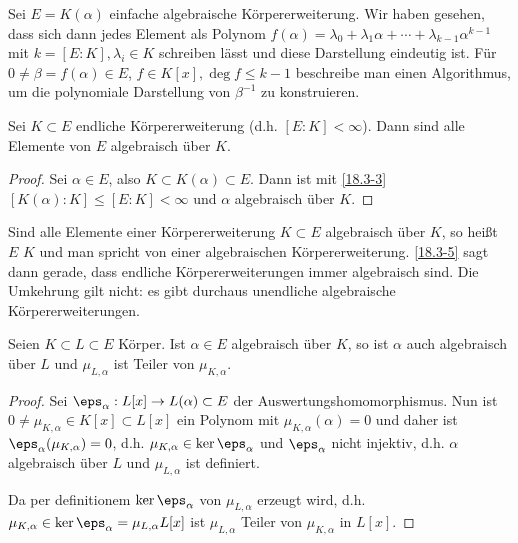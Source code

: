 \begin{ex} \label{18.3-4}
	Sei $E = K(\alpha)$ einfache algebraische Körpererweiterung.
	Wir haben gesehen, dass sich dann jedes Element als Polynom $f(\alpha) = \lambda_0 + \lambda_1 \alpha + \dotsb + \lambda_{k-1} \alpha^{k-1}$ mit $k = [E : K], \lambda_i \in K$ schreiben lässt und diese Darstellung eindeutig ist.
	Für $0 \neq \beta = f(\alpha) \in E$, $f \in K[x], \deg f \le k-1$ beschreibe man einen Algorithmus, um die polynomiale Darstellung von $\beta^{-1}$ zu konstruieren.
\end{ex}

\begin{kor} \label{18.3-5}
	Sei $K \subset E$ endliche Körpererweiterung (d.h. $[E : K] < \infty$).
	Dann sind alle Elemente von $E$ algebraisch über $K$.
	\begin{proof}
		Sei $\alpha \in E$, also $K \subset K(\alpha) \subset E$.
		Dann ist mit \ref{18.3-3} $[K(\alpha) : K] \le [E : K] < \infty$ und $\alpha$ algebraisch über $K$.
	\end{proof}
\end{kor}

Sind alle Elemente einer Körpererweiterung $K \subset E$ algebraisch über $K$, so heißt $E$  $K$ und man spricht von einer algebraischen Körpererweiterung.
\ref{18.3-5} sagt dann gerade, dass endliche Körpererweiterungen immer algebraisch sind.
Die Umkehrung gilt nicht: es gibt durchaus unendliche algebraische Körpererweiterungen.

\begin{lem} \label{18.3-6}
	Seien $K \subset L \subset E$ Körper.
	Ist $\alpha \in E$ algebraisch über $K$, so ist $\alpha$ auch algebraisch über $L$ und $\mu_{L, \alpha}$ ist Teiler von $\mu_{K, \alpha}$.
	\begin{proof}
		Sei $\eps_\alpha: L[x] \to L(\alpha) \subset E$ der Auswertungshomomorphismus.
		Nun ist $0 \neq \mu_{K, \alpha} \in K[x] \subset L[x]$ ein Polynom mit $\mu_{K, \alpha}(\alpha) = 0$ und daher ist $\eps_\alpha(\mu_{K, \alpha}) = 0$, d.h. $\mu_{K, \alpha} \in \ker \eps_\alpha$ und $\eps_\alpha$ nicht injektiv, d.h. $\alpha$ algebraisch über $L$ und $\mu_{L,\alpha}$ ist definiert.

		Da per definitionem $\ker \eps_\alpha$ von $\mu_{L, \alpha}$ erzeugt wird, d.h. $\mu_{K,\alpha} \in \ker \eps_\alpha = \mu_{L,\alpha} L[x]$ ist $\mu_{L,\alpha}$ Teiler von $\mu_{K, \alpha}$ in $L[x]$.
	\end{proof}
\end{lem}

